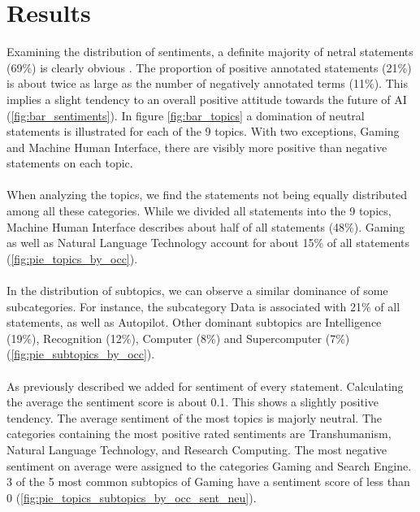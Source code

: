 \section{Results}
Examining the distribution of sentiments, a definite majority of netral statements  (69\%) is clearly obvious . The proportion of positive annotated statements (21\%) is about twice as large as the number of negatively annotated terms (11\%). This implies a slight tendency to an overall positive attitude towards the future of AI (\autoref{fig:bar_sentiments}). In figure \ref{fig:bar_topics} a domination of neutral statements is illustrated for each of the 9 topics. With two exceptions, Gaming and Machine Human Interface, there are visibly more positive than negative statements on each topic. 
\\
\\
When analyzing the topics, we find the statements not being equally distributed among all these categories. While we divided all statements into the 9 topics, Machine Human Interface describes about half of all statements (48\%). Gaming as well as Natural Language Technology account for about 15\% of all statements (\autoref{fig:pie_topics_by_occ}). 
\\
\\
In the distribution of subtopics, we can observe a similar dominance of some subcategories. For instance, the subcategory Data is associated with 21\% of all statements, as well as Autopilot. Other dominant subtopics are Intelligence (19\%), Recognition (12\%), Computer (8\%) and Supercomputer (7\%) (\autoref{fig:pie_subtopics_by_occ}). 
\\
\\
As previously described we added for sentiment of every statement. Calculating the average the sentiment score is about 0.1. This shows a slightly positive tendency. The average sentiment of the most topics is majorly neutral. The categories containing the most positive rated sentiments are Transhumanism, Natural Language Technology, and Research Computing. The most negative sentiment on average were assigned to the categories Gaming and Search Engine. 3 of the 5 most common subtopics of Gaming have a sentiment score of less than 0 (\autoref{fig:pie_topics_subtopics_by_occ_sent_neu}).
